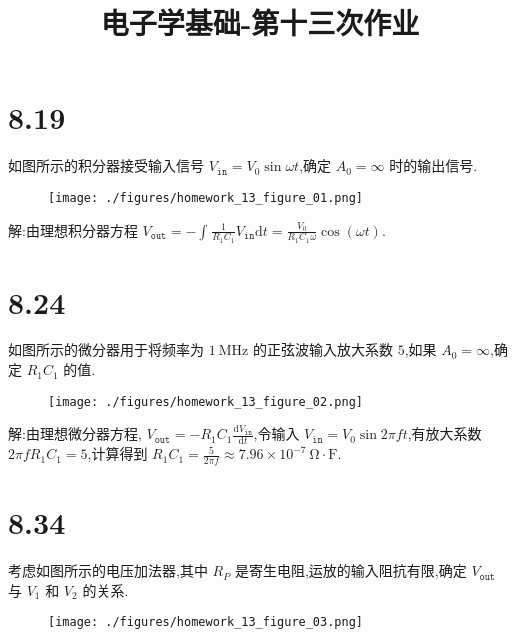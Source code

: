 
\usepackage{../../homeworks_preamble}
\title{电子学基础-第十三次作业}


    \maketitle
    \section{8.19} 如图所示的积分器接受输入信号 $V_{\texttt{in}}=V_0\sin\omega t$,确定 $A_0=\infty$ 时的输出信号.
    \begin{figure}[htbp]
        \centering
        \texttt{[image: ./figures/homework\_13\_figure\_01.png]}
    \end{figure}

    解:由理想积分器方程 $V_{\texttt{out}}=-\int_{}^{}\frac{1}{R_1C_1}V_{\texttt{in}}\mathrm{d}t=\frac{V_0}{R_1C_1\omega}\cos\left( \omega t \right) $.
    \section{8.24} 如图所示的微分器用于将频率为 $1 \ \mathrm{MHz}$ 的正弦波输入放大系数 $5$,如果 $A_0=\infty$,确定 $R_1C_1$ 的值.
    \begin{figure}[htbp]
        \centering
        \texttt{[image: ./figures/homework\_13\_figure\_02.png]}
    \end{figure}
    \newpage
    解:由理想微分器方程, $V_{\texttt{out}}=-R_1C_1 \frac{\mathrm{d}V_{\texttt{in}}}{\mathrm{d}t}$,令输入 $V_{\texttt{in}}=V_0\sin 2\pi f t$,有放大系数 $2\pi f R_1C_1=5$,计算得到 $R_1C_1=\frac{5}{2\pi f}\approx 7.96\times 10^{-7} \ \mathrm{\Omega\cdot F}$.
    \section{8.34} 考虑如图所示的电压加法器,其中 $R_{P}$ 是寄生电阻,运放的输入阻抗有限,确定 $V_{\texttt{out}}$ 与 $V_1$ 和 $V_2$ 的关系.
    \begin{figure}[htbp]
        \centering
        \texttt{[image: ./figures/homework\_13\_figure\_03.png]}
    \end{figure}
    
